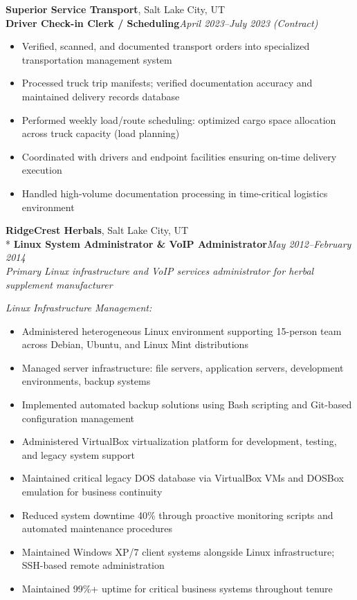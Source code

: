 \documentclass[9pt,letterpaper]{extarticle}
\begin{document}
\vspace{5pt}
\noindent\textbf{Superior Service Transport}, Salt Lake City, UT\\
\textbf{Driver Check-in Clerk / Scheduling}\hfill\textit{April 2023--July 2023 (Contract)}
\begin{itemize}
  \item Verified, scanned, and documented transport orders into specialized transportation management system
  \item Processed truck trip manifests; verified documentation accuracy and maintained delivery records database
  \item Performed weekly load/route scheduling: optimized cargo space allocation across truck capacity (load planning)
  \item Coordinated with drivers and endpoint facilities ensuring on-time delivery execution
  \item Handled high-volume documentation processing in time-critical logistics environment
\end{itemize}

\vspace{5pt}
\noindent\textbf{RidgeCrest Herbals}, Salt Lake City, UT\\*
\textbf{Linux System Administrator \& VoIP Administrator}\hfill\textit{May 2012--February 2014}\\
\textit{Primary Linux infrastructure and VoIP services administrator for herbal supplement manufacturer}

\smallskip\textit{Linux Infrastructure Management:}
\begin{itemize}
  \item Administered heterogeneous Linux environment supporting 15-person team across Debian, Ubuntu, and Linux Mint distributions
  \item Managed server infrastructure: file servers, application servers, development environments, backup systems
  \item Implemented automated backup solutions using Bash scripting and Git-based configuration management
  \item Administered VirtualBox virtualization platform for development, testing, and legacy system support
  \item Maintained critical legacy DOS database via VirtualBox VMs and DOSBox emulation for business continuity
  \item Reduced system downtime 40\% through proactive monitoring scripts and automated maintenance procedures
  \item Maintained Windows XP/7 client systems alongside Linux infrastructure; SSH-based remote administration
  \item Maintained 99\%+ uptime for critical business systems throughout tenure
\end{itemize}
\end{document}
